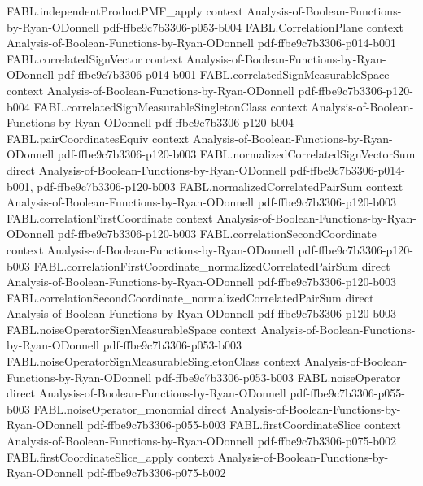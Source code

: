 \begin{theorem}
\proofstep
  {FABL.independentProductPMF_apply}
  {context}
  {Analysis-of-Boolean-Functions-by-Ryan-ODonnell}
  {pdf-ffbe9c7b3306-p053-b004}
\proofstep
  {FABL.CorrelationPlane}
  {context}
  {Analysis-of-Boolean-Functions-by-Ryan-ODonnell}
  {pdf-ffbe9c7b3306-p014-b001}
\proofstep
  {FABL.correlatedSignVector}
  {context}
  {Analysis-of-Boolean-Functions-by-Ryan-ODonnell}
  {pdf-ffbe9c7b3306-p014-b001}
\proofstep
  {FABL.correlatedSignMeasurableSpace}
  {context}
  {Analysis-of-Boolean-Functions-by-Ryan-ODonnell}
  {pdf-ffbe9c7b3306-p120-b004}
\proofstep
  {FABL.correlatedSignMeasurableSingletonClass}
  {context}
  {Analysis-of-Boolean-Functions-by-Ryan-ODonnell}
  {pdf-ffbe9c7b3306-p120-b004}
\proofstep
  {FABL.pairCoordinatesEquiv}
  {context}
  {Analysis-of-Boolean-Functions-by-Ryan-ODonnell}
  {pdf-ffbe9c7b3306-p120-b003}
\proofstep
  {FABL.normalizedCorrelatedSignVectorSum}
  {direct}
  {Analysis-of-Boolean-Functions-by-Ryan-ODonnell}
  {pdf-ffbe9c7b3306-p014-b001,
    pdf-ffbe9c7b3306-p120-b003}
\proofstep
  {FABL.normalizedCorrelatedPairSum}
  {context}
  {Analysis-of-Boolean-Functions-by-Ryan-ODonnell}
  {pdf-ffbe9c7b3306-p120-b003}
\proofstep
  {FABL.correlationFirstCoordinate}
  {context}
  {Analysis-of-Boolean-Functions-by-Ryan-ODonnell}
  {pdf-ffbe9c7b3306-p120-b003}
\proofstep
  {FABL.correlationSecondCoordinate}
  {context}
  {Analysis-of-Boolean-Functions-by-Ryan-ODonnell}
  {pdf-ffbe9c7b3306-p120-b003}
\proofstep
  {FABL.correlationFirstCoordinate_normalizedCorrelatedPairSum}
  {direct}
  {Analysis-of-Boolean-Functions-by-Ryan-ODonnell}
  {pdf-ffbe9c7b3306-p120-b003}
\proofstep
  {FABL.correlationSecondCoordinate_normalizedCorrelatedPairSum}
  {direct}
  {Analysis-of-Boolean-Functions-by-Ryan-ODonnell}
  {pdf-ffbe9c7b3306-p120-b003}
\proofstep
  {FABL.noiseOperatorSignMeasurableSpace}
  {context}
  {Analysis-of-Boolean-Functions-by-Ryan-ODonnell}
  {pdf-ffbe9c7b3306-p053-b003}
\proofstep
  {FABL.noiseOperatorSignMeasurableSingletonClass}
  {context}
  {Analysis-of-Boolean-Functions-by-Ryan-ODonnell}
  {pdf-ffbe9c7b3306-p053-b003}
\proofstep
  {FABL.noiseOperator}
  {direct}
  {Analysis-of-Boolean-Functions-by-Ryan-ODonnell}
  {pdf-ffbe9c7b3306-p055-b003}
\proofstep
  {FABL.noiseOperator_monomial}
  {direct}
  {Analysis-of-Boolean-Functions-by-Ryan-ODonnell}
  {pdf-ffbe9c7b3306-p055-b003}
\proofstep
  {FABL.firstCoordinateSlice}
  {context}
  {Analysis-of-Boolean-Functions-by-Ryan-ODonnell}
  {pdf-ffbe9c7b3306-p075-b002}
\proofstep
  {FABL.firstCoordinateSlice_apply}
  {context}
  {Analysis-of-Boolean-Functions-by-Ryan-ODonnell}
  {pdf-ffbe9c7b3306-p075-b002}

\end{theorem}
